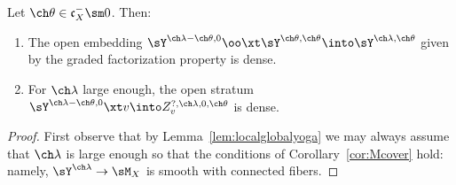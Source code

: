 \begin{lem}
\notready \label{lem:comp-cover}
Let $\ch\theta\in \mathfrak c_X^- \sm 0$.
Then:
\begin{enumerate}
\item The open embedding
$ \sY^{\ch\lambda-\ch\theta,0} \oo\xt \sY^{\ch\theta,\ch\theta} \into
\sY^{\ch\lambda,\ch\theta}$
given by the graded factorization property is dense.
\item For $\ch\lambda$ large enough,
the open stratum $\sY^{\ch\lambda-\ch\theta,0} \xt v
\into Z^{?,\ch\lambda,0,\ch\theta}_v$ is dense.
\end{enumerate}
\end{lem}
\begin{proof}
First observe that by Lemma~\ref{lem:localglobalyoga} we may
always assume that $\ch\lambda$ is large enough so that
the conditions of Corollary~\ref{cor:Mcover} hold: namely,
$\sY^{\ch\lambda}\to \sM_X$ is smooth with connected fibers.


\end{proof}
